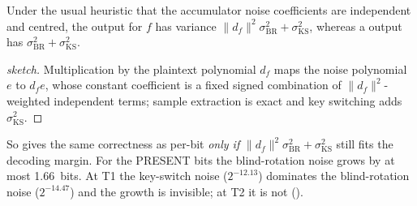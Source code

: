\begin{theorem}\label{thm:noise}
Under the usual heuristic that the accumulator noise coefficients are independent and centred,
the \MVPBS{} output for $f$ has variance $\|d_f\|^2\sigma^2_{\mathrm{BR}}+\sigma^2_{\mathrm{KS}}$,
whereas a \PBSop{} output has $\sigma^2_{\mathrm{BR}}+\sigma^2_{\mathrm{KS}}$.
\end{theorem}
\begin{proof}[sketch]
Multiplication by the plaintext polynomial $d_f$ maps the noise polynomial $e$ to $d_fe$, whose
constant coefficient is a fixed signed combination of $\|d_f\|^2$-weighted independent terms;
sample extraction is exact and key switching adds $\sigma^2_{\mathrm{KS}}$.
\end{proof}
So \MVPBS{} gives the same correctness as per-bit \PBSop{} \emph{only if}
$\|d_f\|^2\sigma^2_{\mathrm{BR}}+\sigma^2_{\mathrm{KS}}$ still fits the decoding margin. For the
PRESENT bits the blind-rotation noise grows by at most 1.66~bits. At T1 the
key-switch noise ($2^{-12.13}$) dominates the blind-rotation noise
($2^{-14.47}$) and the growth is invisible; at T2 it is not ().
